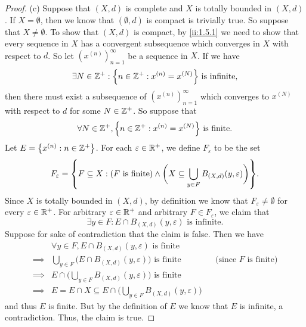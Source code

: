 \begin{proof}{(c)}
  Suppose that \((X, d)\) is complete and \(X\) is totally bounded in \((X, d)\).
  If \(X = \emptyset\), then we know that \((\emptyset, d)\) is compact is trivially true.
  So suppose that \(X \neq \emptyset\).
  To show that \((X, d)\) is compact, by \cref{ii:1.5.1} we need to show that every sequence in \(X\) has a convergent subsequence which converges in \(X\) with respect to \(d\).
  So let \((x^{(n)})_{n = 1}^\infty\) be a sequence in \(X\).
  If we have
  \[
    \exists N \in \Z^+ : \set{n \in \Z^+ : x^{(n)} = x^{(N)}} \text{ is infinite},
  \]
  then there must exist a subsequence of \((x^{(n)})_{n = 1}^\infty\) which converges to \(x^{(N)}\) with respect to \(d\) for some \(N \in \mathbb{Z}^+\).
  So suppose that
  \[
    \forall N \in \Z^+, \set{n \in \Z^+ : x^{(n)} = x^{(N)}} \text{ is finite}.
  \]
  Let \(E = \left\lbrace x^{(n)} : n \in \mathbb{Z}^+\right\rbrace\).
  For each \(\varepsilon \in \mathbb{R}^+\), we define \(F_\varepsilon\) to be the set
  \[
    F_\varepsilon = \set{F \subseteq X : (F \text{ is finite}) \land \bigg(X \subseteq \bigcup_{y \in F} B_{(X, d)}(y, \varepsilon)\bigg)}.
  \]
  Since \(X\) is totally bounded in \((X, d)\), by definition we know that \(F_\varepsilon \neq \emptyset\) for every \(\varepsilon \in \mathbb{R}^+\).
  For arbitrary \(\varepsilon \in \mathbb{R}^+\) and arbitrary \(F \in F_\varepsilon\), we claim that
  \[
    \exists y \in F : E \cap B_{(X, d)}(y, \varepsilon) \text{ is infinite}.
  \]
  Suppose for sake of contradiction that the claim is false.
  Then we have
  \begin{align*}
             & \forall y \in F, E \cap B_{(X, d)}(y, \varepsilon) \text{ is finite}                                                       \\
    \implies & \bigcup_{y \in F} \bigg(E \cap B_{(X, d)}(y, \varepsilon)\bigg) \text{ is finite}      &  & \text{(since \(F\) is finite)} \\
    \implies & E \cap \bigg(\bigcup_{y \in F} B_{(X, d)}(y, \varepsilon)\bigg) \text{ is finite}                                          \\
    \implies & E = E \cap X \subseteq E \cap \bigg(\bigcup_{y \in F} B_{(X, d)}(y, \varepsilon)\bigg)
  \end{align*}
  and thus \(E\) is finite.
  But by the definition of \(E\) we know that \(E\) is infinite, a contradiction.
  Thus, the claim is true.


\end{proof}
